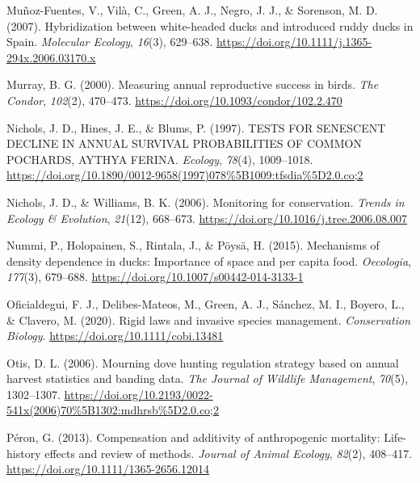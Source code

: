 \documentclass[
  english,
]{article}
\newlength{\cslhangindent}
\newlength{\cslentryspacingunit} %
\newenvironment{CSLReferences}[2] %
 {%
  \setlength{\parindent}{0pt}
  \ifodd #1
  \let\oldpar\par
  \def\par{\hangindent=\cslhangindent\oldpar}
  \fi
  \setlength{\parskip}{#2\cslentryspacingunit}
 }%
 {}
\begin{document}
\begin{CSLReferences}{1}{0}
\leavevmode{}%
Muñoz-Fuentes, V., Vilà, C., Green, A. J., Negro, J. J., \& Sorenson, M. D. (2007). Hybridization between white-headed ducks and introduced ruddy ducks in {S}pain. \emph{Molecular Ecology}, \emph{16}(3), 629--638. \url{https://doi.org/10.1111/j.1365-294x.2006.03170.x}

\leavevmode{}%
Murray, B. G. (2000). Measuring annual reproductive success in birds. \emph{The Condor}, \emph{102}(2), 470--473. \url{https://doi.org/10.1093/condor/102.2.470}

\leavevmode{}%
Nichols, J. D., Hines, J. E., \& Blums, P. (1997). {TESTS} {FOR} {SENESCENT} {DECLINE} {IN} {ANNUAL} {SURVIVAL} {PROBABILITIES} {OF} {COMMON} {POCHARDS}, {AYTHYA} {FERINA}. \emph{Ecology}, \emph{78}(4), 1009--1018. \url{https://doi.org/10.1890/0012-9658(1997)078\%5B1009:tfsdia\%5D2.0.co;2}

\leavevmode{}%
Nichols, J. D., \& Williams, B. K. (2006). Monitoring for conservation. \emph{Trends in Ecology \& Evolution}, \emph{21}(12), 668--673. \url{https://doi.org/10.1016/j.tree.2006.08.007}

\leavevmode{}%
Nummi, P., Holopainen, S., Rintala, J., \& Pöysä, H. (2015). Mechanisms of density dependence in ducks: Importance of space and per capita food. \emph{Oecologia}, \emph{177}(3), 679--688. \url{https://doi.org/10.1007/s00442-014-3133-1}

\leavevmode{}%
Oficialdegui, F. J., Delibes-Mateos, M., Green, A. J., Sánchez, M. I., Boyero, L., \& Clavero, M. (2020). Rigid laws and invasive species management. \emph{Conservation Biology}. \url{https://doi.org/10.1111/cobi.13481}

\leavevmode{}%
Otis, D. L. (2006). Mourning dove hunting regulation strategy based on annual harvest statistics and banding data. \emph{The Journal of Wildlife Management}, \emph{70}(5), 1302--1307. \url{https://doi.org/10.2193/0022-541x(2006)70\%5B1302:mdhrsb\%5D2.0.co;2}

\leavevmode{}%
Péron, G. (2013). Compensation and additivity of anthropogenic mortality: Life-history effects and review of methods. \emph{Journal of Animal Ecology}, \emph{82}(2), 408--417. \url{https://doi.org/10.1111/1365-2656.12014}


\end{CSLReferences}
\end{document}
